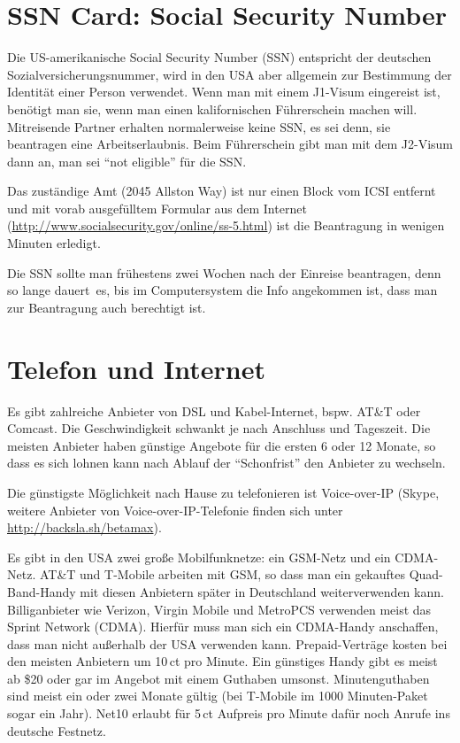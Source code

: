 \documentclass[a4paper]{scrreprt}
\begin{document}
\section{SSN Card: Social Security Number}

Die US-amerikanische Social Security Number (SSN) entspricht der deutschen Sozialversicherungsnummer, wird in den USA aber allgemein zur Bestimmung der Identität einer Person verwendet. Wenn man mit einem J1-Visum eingereist ist, benötigt man sie, wenn man einen kalifornischen Führerschein machen will. Mitreisende Partner erhalten normalerweise keine SSN, es sei denn, sie beantragen eine Arbeitserlaubnis. Beim Führerschein gibt man mit dem J2-Visum dann an, man sei "`not eligible"' für die SSN.

Das zuständige Amt (2045 Allston Way) ist nur einen Block vom ICSI entfernt und mit vorab ausgefülltem Formular aus dem Internet (\url{http://www.socialsecurity.gov/online/ss-5.html}) ist die Beantragung in wenigen Minuten erledigt.

Die SSN sollte man frühestens zwei Wochen nach der Einreise beantragen, denn so lange dauert~es, bis im Computersystem die Info angekommen ist, dass man zur Beantragung auch berechtigt ist.


\section{Telefon und Internet}

Es gibt zahlreiche Anbieter von DSL und Kabel-Internet, bspw. AT\&T oder Comcast. 
Die Geschwindigkeit schwankt je nach Anschluss und Tageszeit. Die meisten Anbieter haben günstige Angebote für die ersten 6 oder 12 Monate, so dass es sich lohnen kann nach Ablauf der ``Schonfrist'' den Anbieter zu wechseln.

Die günstigste Möglichkeit nach Hause zu telefonieren ist Voice-over-IP (Skype, weitere Anbieter von Voice-over-IP-Telefonie finden sich unter  \url{http://backsla.sh/betamax}).

Es gibt in den USA zwei große Mobilfunknetze: ein GSM-Netz und ein CDMA-Netz. AT\&T und T-Mobile arbeiten mit GSM, so dass man ein gekauftes Quad-Band-Handy mit diesen Anbietern später in Deutschland weiterverwenden kann. Billiganbieter wie Verizon, Virgin Mobile und MetroPCS verwenden meist das Sprint Network (CDMA). Hierfür muss man sich ein CDMA-Handy anschaffen, dass man nicht außerhalb der USA verwenden kann.
Prepaid-Verträge kosten bei den meisten Anbietern um 10\,ct pro Minute. Ein günstiges Handy gibt es meist ab \$20 oder gar im Angebot mit einem Guthaben umsonst. Minutenguthaben sind meist ein oder zwei Monate gültig (bei T-Mobile im 1000 Minuten-Paket sogar ein Jahr). Net10 erlaubt für 5\,ct Aufpreis pro Minute dafür noch Anrufe ins deutsche Festnetz.
\end{document}
